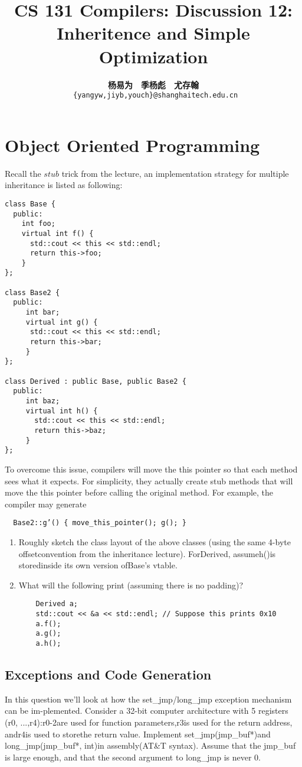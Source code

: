 \documentclass[a4paper]{article}
\title{CS 131 Compilers: Discussion 12: Inheritence and Simple Optimization}
\author{\textbf{杨易为}~~\textbf{季杨彪}~~\textbf{尤存翰} \\ \texttt{ \{yangyw,jiyb,youch\}@shanghaitech.edu.cn}}
\theoremstyle{definition}
\begin{document}
\maketitle
\section{Object Oriented Programming}
Recall the $stub$ trick from the lecture, an implementation strategy for multiple inheritance is listed as following:

\begin{verbatim}
class Base {
  public:
    int foo;
    virtual int f() {
      std::cout << this << std::endl; 
      return this->foo;
    }
};

class Base2 {
  public:
     int bar;
     virtual int g() {
      std::cout << this << std::endl; 
      return this->bar;
     }
};

class Derived : public Base, public Base2 {
  public:
     int baz;
     virtual int h() {
       std::cout << this << std::endl; 
       return this->baz;
     }
};
\end{verbatim}

To overcome this issue, compilers will move the this pointer so that each method sees what it expects. For simplicity, they actually create stub methods that will move the this pointer before calling the original method. For example, the compiler may generate

\begin{verbatim}
  Base2::g’() { move_this_pointer(); g(); }
\end{verbatim}

\begin{enumerate}
  \item Roughly sketch the class layout of the above classes (using the same 4-byte offsetconvention  from  the  inheritance  lecture).   ForDerived,  assumeh()is  storedinside its own version ofBase’s vtable.
  \item What will the following print (assuming there is no padding)?
  \begin{verbatim}
    Derived a;
    std::cout << &a << std::endl; // Suppose this prints 0x10
    a.f();
    a.g();
    a.h();
  \end{verbatim}
\end{enumerate}

\subsection{Exceptions and Code Generation}
In  this  question  we’ll  look  at  how  the  set\_jmp/long\_jmp  exception  mechanism  can  be  im-plemented.   Consider  a  32-bit  computer  architecture  with  5  registers  (r0,  ...,r4):r0-2are used for function parameters,r3is used for the return address, andr4is used to storethe return value.  Implement set\_jmp(jmp\_buf*)and long\_jmp(jmp\_buf*, int)in assembly(AT\&T syntax).  Assume that the jmp\_buf is large enough, and that the second argument to long\_jmp is never 0.
\end{document}
